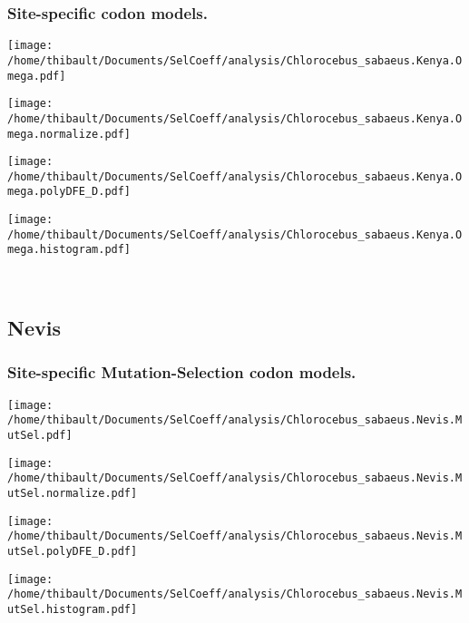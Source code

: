\subsubsection*{Site-specific codon models.} 
\begin{minipage}{0.49\linewidth} 
\texttt{[image: /home/thibault/Documents/SelCoeff/analysis/Chlorocebus\_sabaeus.Kenya.Omega.pdf]} 
\end{minipage}
\begin{minipage}{0.49\linewidth} 
\texttt{[image: /home/thibault/Documents/SelCoeff/analysis/Chlorocebus\_sabaeus.Kenya.Omega.normalize.pdf]} 
\end{minipage}
\begin{minipage}{0.49\linewidth} 
\texttt{[image: /home/thibault/Documents/SelCoeff/analysis/Chlorocebus\_sabaeus.Kenya.Omega.polyDFE\_D.pdf]} 
\end{minipage}
\begin{minipage}{0.49\linewidth} 
\texttt{[image: /home/thibault/Documents/SelCoeff/analysis/Chlorocebus\_sabaeus.Kenya.Omega.histogram.pdf]} 
\end{minipage}
\\ 
\subsection{Nevis} 
 
\subsubsection*{Site-specific Mutation-Selection codon models.} 
\begin{minipage}{0.49\linewidth} 
\texttt{[image: /home/thibault/Documents/SelCoeff/analysis/Chlorocebus\_sabaeus.Nevis.MutSel.pdf]} 
\end{minipage}
\begin{minipage}{0.49\linewidth} 
\texttt{[image: /home/thibault/Documents/SelCoeff/analysis/Chlorocebus\_sabaeus.Nevis.MutSel.normalize.pdf]} 
\end{minipage}
\begin{minipage}{0.49\linewidth} 
\texttt{[image: /home/thibault/Documents/SelCoeff/analysis/Chlorocebus\_sabaeus.Nevis.MutSel.polyDFE\_D.pdf]} 
\end{minipage}
\begin{minipage}{0.49\linewidth} 
\texttt{[image: /home/thibault/Documents/SelCoeff/analysis/Chlorocebus\_sabaeus.Nevis.MutSel.histogram.pdf]} 
\end{minipage}
\\ 

